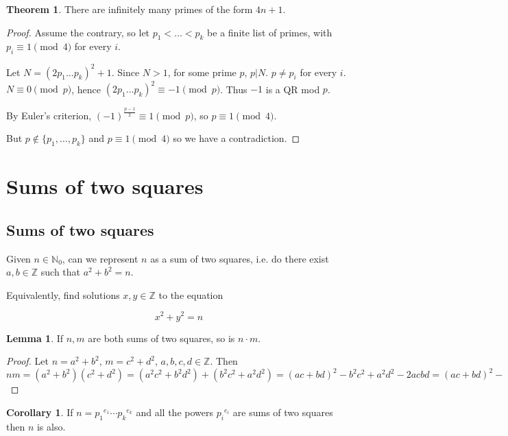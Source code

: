 \documentclass[12pt,a4paper]{article}
\theoremstyle{definition}
\newtheorem{theorem}[definition]{Theorem}
\newtheorem{corollary}[definition]{Corollary}
\newtheorem{lemma}[definition]{Lemma}
\begin{document}
\begin{theorem}
	There are infinitely many primes of the form $4n + 1$.
\end{theorem}

\begin{proof}
	Assume the contrary, so let $p_1 < \dots < p_k$ be a finite list of primes, with $p_i \equiv 1 \pmod{4}$ for every $i$.

	Let $N = (2p_1 \dots p_k)^2 + 1$. Since $N > 1$, for some prime $p$, $p | N$. $p \ne p_i$ for every $i$. $N \equiv 0 \pmod{p}$, hence $(2p_1 \dots p_k)^2 \equiv -1 \pmod{p}$. Thus $-1$ is a QR mod $p$.

	By Euler's criterion, $(-1)^{\frac{p - 1}{2}} \equiv 1 \pmod{p}$, so $p \equiv 1 \pmod{4}$.

	But $p \notin \{p_1, \dots, p_k\}$ and $p \equiv 1 \pmod{4}$ so we have a contradiction.
\end{proof}

\break

\section{Sums of two squares}

\subsection{Sums of two squares}

Given $n \in \mathbb{N}_0$, can we represent $n$ as a sum of two squares, i.e. do there exist $a, b \in \mathbb{Z}$ such that $a^2 + b^2 = n$.

Equivalently, find solutions $x, y \in \mathbb{Z}$ to the equation

\[x^2 + y^2 = n\]

\begin{lemma}
	If $n, m$ are both sums of two squares, so is $n \cdot m$.
\end{lemma}

\begin{proof}
	Let $n = a^2 + b^2$, $m = c^2 + d^2$, $a, b, c, d \in \mathbb{Z}$. Then $nm = (a^2 + b^2)(c^2 + d^2) = (a^2 c^2 + b^2 d^2) + (b^2 c^2 + a^2 d^2) = (ac + bd)^2 - b^2 c^2 + a^2 d^2 - 2acbd = (ac + bd)^2 - (ad - bc)^2$
\end{proof}

\begin{corollary}
	If $n = {p_1}^{e_1} \cdots {p_k}^{e_k}$ and all the powers ${p_i}^{e_i}$ are sums of two squares then $n$ is also.
\end{corollary}
\end{document}
